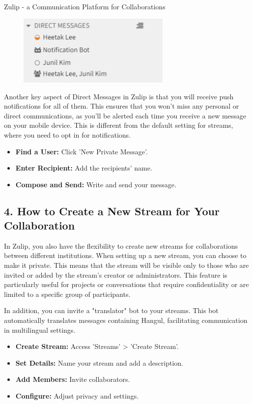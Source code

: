 \begin{coverpage}{Zulip - a Communication Platform for Collaborations}
{\begin{figure}[h]
\includegraphics[width=7.5cm]{images/zulip-dm.png}
\centering
\end{figure}

Another key aspect of Direct Messages in Zulip is that you will receive push notifications for all of them. This ensures that you won't miss any personal or direct communications, as you'll be alerted each time you receive a new message on your mobile device. This is different from the default setting for streams, where you need to opt in for notifications.
\begin{itemize}[leftmargin=0.5cm, rightmargin=0.5cm]
\item \textbf{Find a User:} Click 'New Private Message'.
\item \textbf{Enter Recipient:} Add the recipients' name.
\item \textbf{Compose and Send:} Write and send your message.
\end{itemize}
\subsection*{4. How to Create a New Stream for Your Collaboration}
In Zulip, you also have the flexibility to create new streams for collaborations between different institutions. When setting up a new stream, you can choose to make it private. This means that the stream will be visible only to those who are invited or added by the stream's creator or administrators. This feature is particularly useful for projects or conversations that require confidentiality or are limited to a specific group of participants.

In addition, you can invite a "translator" bot to your streams. This bot automatically translates messages containing Hangul, facilitating communication in multilingual settings.
\begin{itemize}[leftmargin=0.5cm, rightmargin=0.5cm]
\item \textbf{Create Stream:} Access 'Streams' > 'Create Stream'.
\item \textbf{Set Details:} Name your stream and add a description.
\item \textbf{Add Members:} Invite collaborators.
\item \textbf{Configure:} Adjust privacy and settings.
\end{itemize}
}
\end{coverpage}
